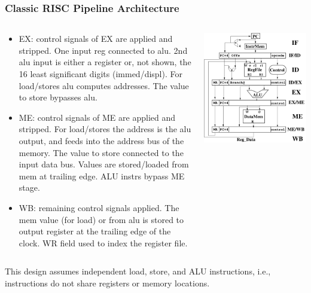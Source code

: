 \documentclass{beamer}
\newcommand{\emp}[1]{\textcolor{DikuRed}{ #1}}
\begin{document}
\begin{frame}[fragile,t]
\frametitle{Classic RISC Pipeline Architecture}

\begin{columns}
\begin{scriptsize}
\begin{itemize}
\item \emp{EX:} control signals of EX are applied and stripped. 
                One input reg connected to {\sc alu}. 2nd {\sc alu}
                input is either a register or, not shown, the 
                16 least significant digits (immed/displ).
                For load/stores {\sc alu} computes addresses.
                The value to store bypasses {\sc alu}.
\item \emp{ME:} control signals of ME are applied and stripped.
                For load/stores the address is the {\sc alu} output,
                and feeds into the address bus of the memory.
                The value to store connected to the input data bus.
                Values are stored/loaded from mem at trailing edge. 
                ALU instrs bypass ME stage.
\item \emp{WB:} remaining control signals applied. The mem value
                (for load) or from {\sc alu} is stored 
                to output register at the trailing edge of the clock.
                WR field used to index the register file.                 
\end{itemize}
\end{scriptsize}
\vspace{-2ex}
\includegraphics[width=37ex]{Figures/ClassicPipeline}
\end{columns}


\emp{This design assumes independent load, store, and ALU instructions},
i.e., instructions do not share registers or memory locations.

\end{frame}
\end{document}
